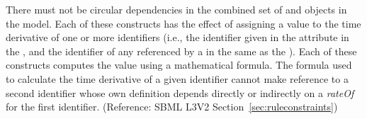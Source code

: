 There must not be circular dependencies in the combined set of \RateRule and \KineticLaw objects in the model.  Each of these constructs has the effect of assigning a value to the time derivative of one or more identifiers (i.e., the identifier given in the attribute  in the \RateRule, and the identifier of any \Species referenced by a \SpeciesReference in the same \Reaction as the \KineticLaw).  Each of these constructs computes the value using a mathematical formula.  The formula used to calculate the time derivative of a given identifier cannot make reference to a second identifier whose own definition depends directly or indirectly on a \emph{rateOf}  for the first identifier.  (Reference: SBML L3V2 Section~\ref{sec:ruleconstraints})
